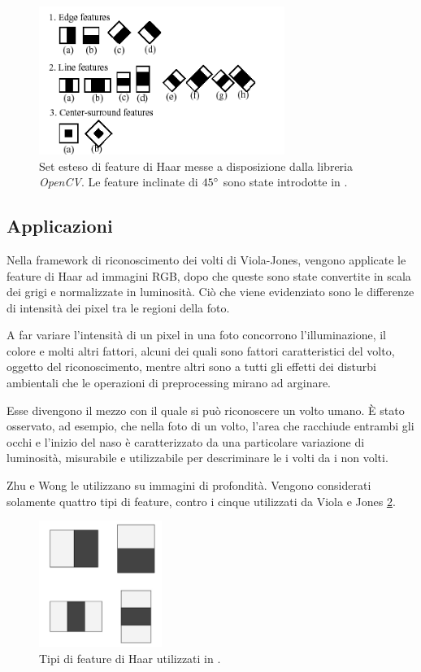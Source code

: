         \begin{figure}
            \centering
            \includegraphics[width=8cm]{img/open_cv_haar_features.png}
            \caption{Set esteso di feature di Haar messe a disposizione dalla libreria \emph{OpenCV}. 
            Le feature inclinate di $45 \degree$ sono state introdotte in \cite{Lienhart02}.}
            \label{fig:opencv_haar_features}
        \end{figure}

        \subsection{Applicazioni} %
        \label{sub:haar_features_applications}
            Nella framework di riconoscimento dei volti di Viola-Jones, vengono applicate le feature di Haar ad immagini RGB, dopo che queste sono state convertite in scala dei grigi e normalizzate in luminosità.
            Ciò che viene evidenziato sono le differenze di intensità dei pixel tra le regioni della foto.

            A far variare l'intensità di un pixel in una foto concorrono l'illuminazione, il colore e molti altri fattori, alcuni dei quali sono fattori caratteristici del volto, oggetto del riconoscimento, mentre altri sono a tutti gli effetti dei disturbi ambientali che le operazioni di preprocessing mirano ad arginare.

            Esse divengono il mezzo con il quale si può riconoscere un volto umano.
            È stato osservato, ad esempio, che nella foto di un volto, l'area che racchiude entrambi gli occhi e l'inizio del naso è caratterizzato da una particolare variazione di luminosità, misurabile e utilizzabile per descriminare le i volti da i non volti.

            Zhu e Wong le utilizzano su immagini di profondità.
            Vengono considerati solamente quattro tipi di feature, contro i cinque utilizzati da Viola e Jones \ref{fig:features_type}.
            \begin{figure}
                \centering
                \includegraphics[width=4cm]{img/feature_types.jpg}
                \caption{Tipi di feature di Haar utilizzati in \cite{Zhu13}.}
                \label{fig:features_type}
            \end{figure}

